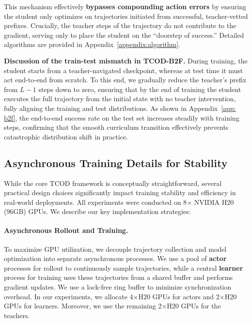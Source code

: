 \documentclass{article} %
\newcommand{\ours}{TCOD\xspace}
\begin{document}

This mechanism effectively \textbf{bypasses compounding action errors} by ensuring the student only optimizes on trajectories initiated from successful, teacher-vetted prefixes. Crucially, the teacher steps of the trajectory do not contribute to the gradient, serving only to place the student on the ``doorstep of success.'' 
Detailed algorithms are provided in Appendix~\ref{appendix:algorithm}.

\textbf{Discussion of the train-test mismatch in \ours-B2F.}
During training, the student starts from a teacher-navigated checkpoint, whereas at test time it must act end-to-end from scratch. 
To this end, we gradually reduce the teacher's prefix from $L-1$ steps down to zero, ensuring that by the end of training the student executes the full trajectory from the initial state with no teacher intervention, fully aligning the training and 
test distributions. 
As shown in Appendix~\ref{app: b2f}, the end-to-end success rate on the test set increases steadily with training steps, confirming that the smooth curriculum transition effectively prevents catastrophic distribution shift in practice.


\subsection{Asynchronous Training Details for Stability}
\label{sec:implementation}

While the core \ours framework is conceptually straightforward, several practical design choices significantly impact training stability and efficiency in real-world deployments. 
All experiments were conducted on 8$\times$ NVIDIA H20 (96GB) GPUs. 
We describe our key implementation strategies:

\paragraph{Asynchronous Rollout and Training.}
To maximize GPU utilization, we decouple trajectory collection and 
model optimization into separate asynchronous processes. 
We use a pool of \textbf{actor} processes for rollout to continuously sample trajectories, while a 
central \textbf{learner} process for training uses these trajectories from a shared buffer and performs gradient updates. 
We use a lock-free ring buffer to minimize synchronization overhead. 
In our experiments, we allocate 4×H20 GPUs for actors and 2×H20 GPUs for learners.
Moreover, we use the remaining 2×H20 GPUs for the teachers.
\end{document}
